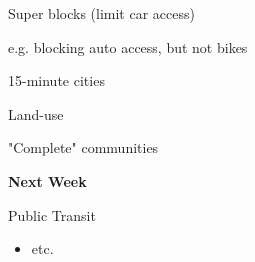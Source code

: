 \documentclass[aspectratio=169]{beamer}
\begin{document}
\begin{frame}
	
	Super blocks (limit car access)
	
	e.g. blocking auto access, but not bikes
	
\end{frame}



\begin{frame}
	
	15-minute cities
	
	Land-use
	
	"Complete" communities
		
\end{frame}




\begin{frame}
	\textbf{Next Week} 
	
	\vspace{4mm}
	
	Public Transit
	
	\begin{itemize}
				
		
		\item etc.
				
		
	\end{itemize}
	
\end{frame}
\end{document}

